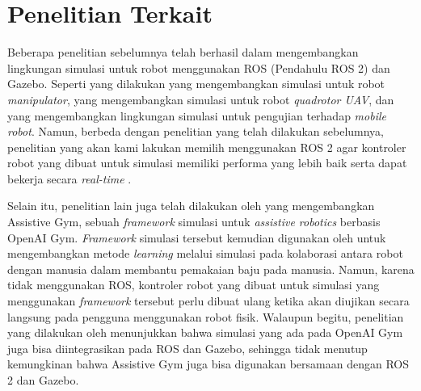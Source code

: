 \section{Penelitian Terkait}
\label{sec:relatedworks}

Beberapa penelitian sebelumnya telah berhasil dalam mengembangkan lingkungan simulasi untuk robot menggunakan ROS (Pendahulu ROS 2) dan Gazebo.
Seperti yang dilakukan \citet{qian2014} yang mengembangkan simulasi untuk robot \emph{manipulator},
  \citet{zhang2015} yang mengembangkan simulasi untuk robot \emph{quadrotor UAV},
  dan \citet{takaya2016} yang mengembangkan lingkungan simulasi untuk pengujian terhadap \emph{mobile robot}.
Namun, berbeda dengan penelitian yang telah dilakukan sebelumnya,
  penelitian yang akan kami lakukan memilih menggunakan ROS 2 agar kontroler robot yang dibuat untuk simulasi memiliki performa yang lebih baik serta dapat bekerja secara \emph{real-time} \citep{maruyama2016}.

Selain itu,
  penelitian lain juga telah dilakukan oleh \citet{erickson2020} yang mengembangkan Assistive Gym,
  sebuah \emph{framework} simulasi untuk \emph{assistive robotics} berbasis OpenAI Gym.
\emph{Framework} simulasi tersebut kemudian digunakan oleh \citet{clegg2020} untuk mengembangkan metode \emph{learning} melalui simulasi pada kolaborasi antara robot dengan manusia dalam membantu pemakaian baju pada manusia.
Namun, karena tidak menggunakan ROS,
  kontroler robot yang dibuat untuk simulasi yang menggunakan \emph{framework} tersebut perlu dibuat ulang ketika akan diujikan secara langsung pada pengguna menggunakan robot fisik.
Walaupun begitu, penelitian yang dilakukan oleh \citet{zamora2016} menunjukkan bahwa simulasi yang ada pada OpenAI Gym juga bisa diintegrasikan pada ROS dan Gazebo,
  sehingga tidak menutup kemungkinan bahwa Assistive Gym juga bisa digunakan bersamaan dengan ROS 2 dan Gazebo.
